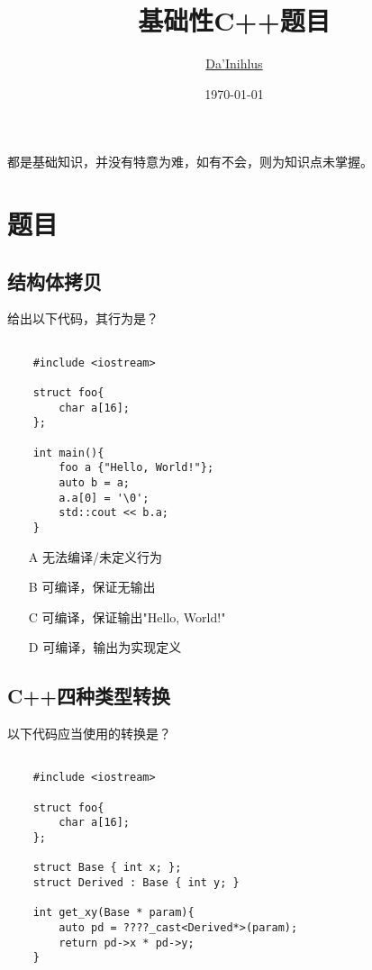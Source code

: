 \documentclass[12pt,fancyhdr]{ctexart}
\title{基础性C++题目}
\author{\href{https://github.com/dynilath}{Da'Inihlus}}
\date{\today}
\begin{document}
\maketitle

都是基础知识，并没有特意为难，如有不会，则为知识点未掌握。

\section{题目}

\subsection{结构体拷贝}
给出以下代码，其行为是？


\begin{verbatim}

    #include <iostream>

    struct foo{
        char a[16];
    };
    
    int main(){
        foo a {"Hello, World!"};
        auto b = a;
        a.a[0] = '\0';
        std::cout << b.a;
    }
\end{verbatim}

\begin{itemize}
    \item [A]
          无法编译/未定义行为
    \item [B]
          可编译，保证无输出
    \item [C]
          可编译，保证输出"Hello, World!"
    \item [D]
          可编译，输出为实现定义
\end{itemize}

\subsection{C++四种类型转换}

以下代码应当使用的转换是？

\begin{verbatim}

    #include <iostream>

    struct foo{
        char a[16];
    };

    struct Base { int x; };
    struct Derived : Base { int y; }
    
    int get_xy(Base * param){
        auto pd = ????_cast<Derived*>(param);
        return pd->x * pd->y;
    }
\end{verbatim}
\end{document}
